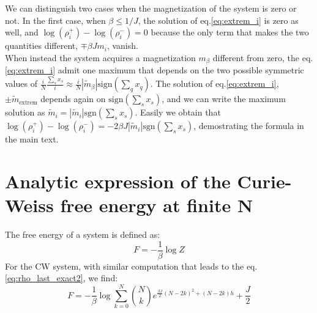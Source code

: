 \documentclass[10pt, notitlepage]{revtex4-2}
\begin{document}
We can distinguish two cases when the magnetization of the system is zero or not. 
In the first case, when $\beta\leq 1/J$, the solution of eq.\ref{eq:extrem_i} is zero as well, and $\log(\rho_i^{+}) - \log(\rho_i^{-})=0$ because the only term that makes the two quantities different, $\mp \beta J m_i$, vanish.\\ 
When instead the system acquires a magnetization $m_{\beta}$ different from zero, the eq.\ref{eq:extrem_i} admit one maximum that depends on the two possible symmetric values of $\frac{i}{N} \frac{\sum_s x_s}{i}\approx \frac{i}{N} |\tilde{m}_{\beta}| \text{sign}(\sum_q x_q)$. 
The solution of eq.\ref{eq:extrem_i}, $\pm \tilde{m}_{\text{extrem}}$ depends again on $\text{sign}(\sum_s x_s)$, and we can write the maximum solution as $\tilde{m}_{i}=|\tilde{m}_i| \text{sgn}(\sum_s x_s)$. 
Easily we obtain that $\log(\rho_i^{+}) - \log(\rho_i^{-}) = -2\beta J|\tilde{m}_i| \text{sgn}(\sum_s x_s)$, demostrating the formula in the main text.

\section{Analytic expression of the Curie-Weiss free energy at finite N}
The free energy of a system is defined as:
\begin{equation}
F = -\frac{1}{\beta} \log Z
\end{equation}
For the CW system, with similar computation that leads to the eq.\ref{eq:rho_last_exact2}, we find:
\begin{equation}
F = -\frac{1}{\beta}\log \sum_{k=0}^{N} \binom{N}{k}e^{\frac{\beta J}{2}\left(N-2k\right)^{2}+\left(N-2k\right)h}  + \frac{J}{2}
\end{equation}
\end{document}
